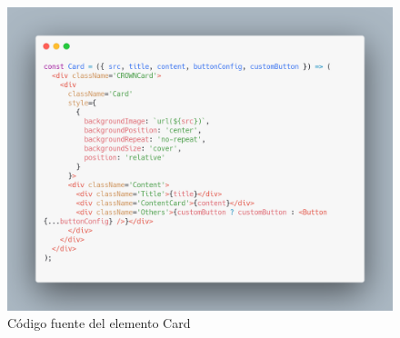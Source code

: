     \begin{figure}[H]
    \centering
    \includegraphics[width=1\textwidth]{./Imagenes/8.37.png}
    \caption[Código fuente del elemento Card]{Código fuente del elemento Card}
    \end{figure}
\clearpage





